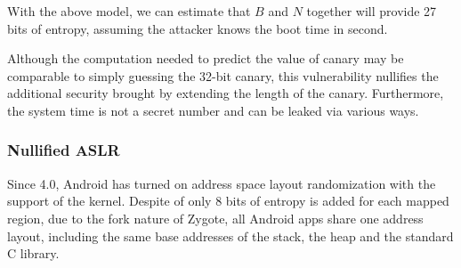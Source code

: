 
With the above model, we can estimate that $B$ and $N$ together will provide 27 bits of entropy, assuming the attacker knows the boot time in second.

Although the computation needed to predict the value of canary may be comparable to simply guessing the 32-bit canary, this vulnerability nullifies the additional security brought by extending the length of the canary. Furthermore, the system time is not a secret number and can be leaked via various ways.

\subsubsection{Nullified ASLR}

Since 4.0, Android has turned on address space layout randomization with the support of the kernel. Despite of only 8 bits of entropy is added for each mapped region, due to the fork nature of Zygote, all Android apps share one address layout, including the same base addresses of the stack, the heap and the standard C library.

